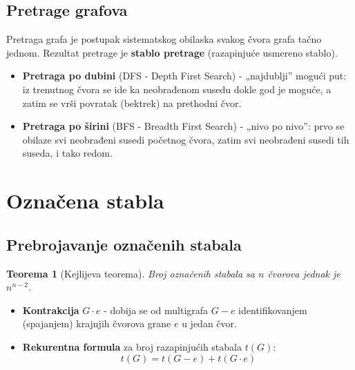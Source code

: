 \documentclass[a4paper,12pt,twoside]{report}
\newtheorem{theorem}{Teorema}[section]
\numberwithin{algorithm}{section}
\begin{document}
\subsection{Pretrage grafova}
Pretraga grafa je postupak sistematskog obilaska svakog čvora grafa tačno jednom. Rezultat pretrage je \textbf{stablo pretrage} (razapinjuće usmereno stablo).

\begin{itemize}
    \item \textbf{Pretraga po dubini} (DFS - Depth First Search) - „najdublji” mogući put: iz trenutnog čvora se ide ka neobrađenom susedu dokle god je moguće, a zatim se vrši povratak (bektrek) na prethodni čvor. 
    \item \textbf{Pretraga po širini} (BFS - Breadth First Search) - „nivo po nivo”: prvo se obilaze svi neobrađeni susedi početnog čvora, zatim svi neobrađeni susedi tih suseda, i tako redom.
\end{itemize}



\section{Označena stabla}
\subsection{Prebrojavanje označenih stabala}
\begin{theorem}[Kejlijeva teorema]
    Broj označenih stabala sa $n$ čvorova jednak je $n^{n-2}$.
\end{theorem}

\begin{itemize}
    \item \textbf{Kontrakcija} $G \cdot e$ - dobija se od multigrafa $G-e$ identifikovanjem (spajanjem) krajnjih čvorova grane $e$ u jedan čvor.
    \item \textbf{Rekurentna formula} za broj razapinjućih stabala $t(G)$:
    $$t(G) = t(G - e) + t(G \cdot e)$$
\end{itemize}
\end{document}
